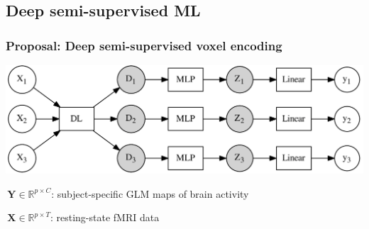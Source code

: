 \documentclass{beamer}
\def\mydot{\structure{\rule{1ex}{1ex}}\,}
\def\B#1{\mathbf{#1}}
\def\emph#1{\textbf{\textcolor{orange}{#1}}}
\begin{document}
\subsection{Deep semi-supervised ML}
\begin{frame}
  \frametitle{Proposal: Deep semi-supervised voxel encoding}
  \includegraphics[width=1.\linewidth]{gen_model.png}
  
  \mydot $\B{Y} \in \mathbb R^{p \times C}$: subject-specific GLM maps of brain activity

 \mydot $\B{X} \in \mathbb R^{p \times T}$: resting-state fMRI data %

 


  
  
\end{frame}
\end{document}
